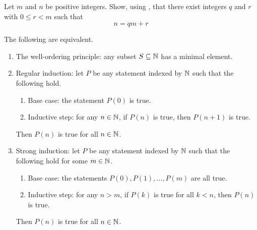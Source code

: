 \documentclass[../main.tex]{subfiles}
\begin{document}
\begin{exercise}
    Let $m$ and $n$ be positive integers. Show, using , that there exist integers $q$ and $r$ with $0 \leq r < m$ such that
    \begin{equation*}
        n = qm + r
    \end{equation*}
\end{exercise}
\begin{theorem} \label{thm:well-order-equivs}
    The following are equivalent.
    \begin{enumerate}[label=(\alph*)]
        \item The well-ordering principle: any subset $S\subseteq\mathbb N$ has a minimal element.
        \item Regular induction: let $P$ be any statement indexed by $\mathbb N$ such that the following hold.
        \begin{enumerate}[label=\arabic*.]
            \item Base case: the statement $P(0)$ is true.
            \item Inductive step: for any $n\in\mathbb N$, if $P(n)$ is true, then $P(n+1)$ is true.
        \end{enumerate}
        Then $P(n)$ is true for all $n\in\mathbb N$.
        \item Strong induction: let $P$ be any statement indexed by $\mathbb N$ such that the following hold for some $m\in\mathbb N$.
        \begin{enumerate}[label=\arabic*.]
            \item Base case: the statements $P(0),P(1),\ldots,P(m)$ are all true.
            \item Inductive step: for any $n>m$, if $P(k)$ is true for all $k<n$, then $P(n)$ is true.
        \end{enumerate}
        Then $P(n)$ is true for all $n\in\mathbb N$.
    \end{enumerate}
\end{theorem}
\end{document}
